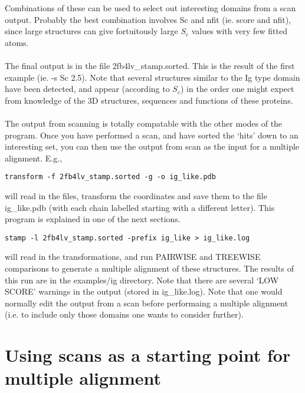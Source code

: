 Combinations of these can be used to select out interesting domains
from a scan output.  Probably the best combination involves Sc and
nfit (ie. score and nfit), since large structures can give
fortuitously large $S_{c}$ values with very few fitted atoms.\\
\\
The final output is in the file 2fb4lv\_stamp.sorted.  This is
the result of the first example (ie. -s Sc 2.5).
Note that several structures similar to the Ig type domain have
been detected, and appear (according to $S_{c}$) in the order one 
might expect from knowledge of the 3D structures, sequences and
functions of these proteins.    \\
\\
The output from scanning is totally compatable with the other modes of 
the program.  Once you have performed a scan, and have sorted the 
`hits' down to an interesting set, you can then use the output from 
scan as the input for a multiple alignment.  E.g.,\\

\begin{scriptsize}\begin{verbatim}
transform -f 2fb4lv_stamp.sorted -g -o ig_like.pdb
\end{verbatim} \end{scriptsize}

will read in the files, transform the coordinates and save them to
the file ig\_like.pdb (with each chain labelled starting with a different
letter).  This program is explained in one of the next sections.\\

\begin{scriptsize}\begin{verbatim}
stamp -l 2fb4lv_stamp.sorted -prefix ig_like > ig_like.log
\end{verbatim} \end{scriptsize}

will read in the transformations, and run PAIRWISE and TREEWISE 
comparisons to generate a multiple alignment of these structures.  The results
of this run are in the examples/ig directory.  Note that there are
several `LOW SCORE' warnings in the output (stored in 
ig\_like.log).  Note that one would normally edit the output from a scan
before performaing a multiple alignment (i.e. to include only those domains
one wants to consider further).


\section{Using scans as a starting point for multiple alignment}

